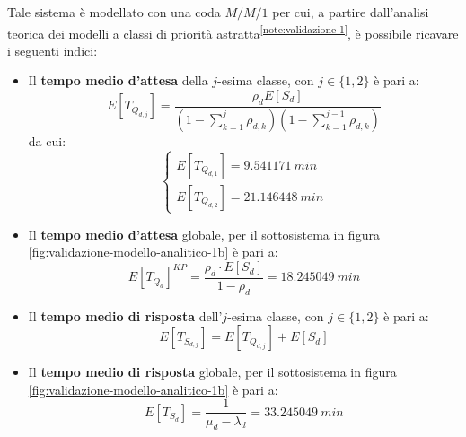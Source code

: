 Tale sistema è modellato con una coda $M/M/1$ per cui, a partire dall'analisi teorica dei modelli a classi di priorità astratta\textsuperscript{\ref{note:validazione-1}}, è possibile ricavare i seguenti indici:
\begin{itemize}
\item Il \textbf{tempo medio d'attesa} della $j$-esima classe, con $j\in\lbrace 1, 2\rbrace$ è pari a:
\begin{equation}
E[T_{Q_{d,j}}] = \frac{\rho_d E[S_d]}{\left(1- \sum_{k=1}^{j} \rho_{d,k}\right)\left(1- \sum_{k=1}^{j-1} \rho_{d,k}\right)}
\end{equation}
da cui:
\begin{equation}
\begin{cases}
E[T_{Q_{d,1}}] = 9.541171\ min \\[1.5em]
E[T_{Q_{d,2}}] = 21.146448\ min
\end{cases}
\end{equation}
\item Il \textbf{tempo medio d'attesa} globale, per il sottosistema in figura \ref{fig:validazione-modello-analitico-1b} è pari a:
\begin{equation}
\label{eqn:validazione-24}
E[T_{Q_d}]^{KP} = \frac{\rho_d \cdot E[S_d]}{1-\rho_d} = 18.245049\ min
\end{equation}
\item Il \textbf{tempo medio di risposta} dell'$j$-esima classe, con $j\in\lbrace 1, 2\rbrace$ è pari a:
\begin{equation}
E[T_{S_{d,j}}] = E[T_{Q_{d,j}}] + E[S_d]
\end{equation}
\item Il \textbf{tempo medio di risposta} globale, per il sottosistema in figura \ref{fig:validazione-modello-analitico-1b} è pari a:
\begin{equation}
\label{eqn:validazione-26}
E[T_{S_d}] = \frac{1}{\mu_d - \lambda_d} = 33.245049\ min
\end{equation}
\end{itemize}


